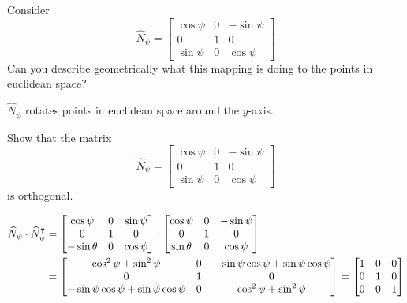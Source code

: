\documentclass[newpage,hints,handout,12pt,noauthor,nooutcomes]{ximera}
\begin{document}
\begin{problem}
  Consider
  \[
  \hat{N}_\psi=\begin{bmatrix}
  \cos\psi & 0 & -\sin\psi\\
  0 & 1 & 0\\
  \sin\psi & 0 & \cos\psi
  \end{bmatrix}
  \]
  Can you describe geometrically what this mapping is doing
  to the points in euclidean space?
  
  
\begin{freeResponse}
$\hat{N}_\psi$ rotates points in euclidean space around the $y$-axis.
\end{freeResponse}

\end{problem}


\begin{problem}
Show that the matrix
\[
\hat{N}_\psi=\begin{bmatrix}
\cos\psi & 0 & -\sin\psi\\
0 & 1 & 0\\
\sin\psi & 0 & \cos\psi
\end{bmatrix}
\]
is orthogonal.

\begin{freeResponse}
\begin{align*}
\widehat{N}_\psi \cdot \widehat{N}_\psi^\intercal
&= \begin{bmatrix}
	\cos\psi & 0 & \sin\psi \\
	0 & 1 & 0 \\
	-\sin\theta & 0 & \cos\psi 
	\end{bmatrix} \cdot
	\begin{bmatrix}
	\cos\psi & 0 & -\sin\psi \\
	0 & 1 & 0 \\
	\sin\theta & 0 & \cos\psi 
	\end{bmatrix}  \\
	&= \begin{bmatrix}
	\cos^{2}\psi + \sin^{2} \psi & 0 & -\sin\psi \cos\psi + \sin\psi \cos\psi \\
	0 &  1 & 0 \\
	 -\sin\psi \cos\psi + \sin\psi \cos\psi & 0 & \cos^{2}\psi + \sin^{2} \psi 
	\end{bmatrix}
	=  \begin{bmatrix}
	1 & 0 & 0 \\
	0 & 1  & 0 \\
	0 & 0 & 1
	\end{bmatrix}
\end{align*}
\end{freeResponse}
\end{problem}
\end{document}
